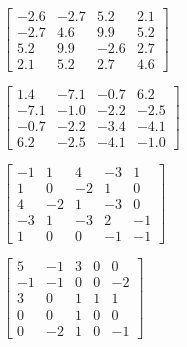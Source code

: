 \begin{exercise}
\begin{Parts}
\begin{OmitV1}
\item  \(\begin{bmatrix} -2.6 & -2.7 & 5.2 & 2.1
\\ -2.7 & 4.6 & 9.9 & 5.2
\\ 5.2 & 9.9 & -2.6 & 2.7
\\ 2.1 & 5.2 & 2.7 & 4.6
\end{bmatrix}\)
\end{OmitV1}


\item  \(\begin{bmatrix} 1.4 & -7.1 & -0.7 & 6.2
\\ -7.1 & -1.0 & -2.2 & -2.5
\\ -0.7 & -2.2 & -3.4 & -4.1
\\ 6.2 & -2.5 & -4.1 & -1.0
\end{bmatrix}\)

\item  \(\begin{bmatrix} -1 & 1 & 4 & -3 & 1
\\ 1 & 0 & -2 & 1 & 0
\\ 4 & -2 & 1 & -3 & 0
\\ -3 & 1 & -3 & 2 & -1
\\ 1 & 0 & 0 & -1 & -1
\end{bmatrix}\)

\begin{OmitV1}
\item  \(\begin{bmatrix} 5 & -1 & 3 & 0 & 0
\\ -1 & -1 & 0 & 0 & -2
\\ 3 & 0 & 1 & 1 & 1
\\ 0 & 0 & 1 & 0 & 0
\\ 0 & -2 & 1 & 0 & -1
\end{bmatrix}\)
\end{OmitV1}


\end{Parts}
\end{exercise}





